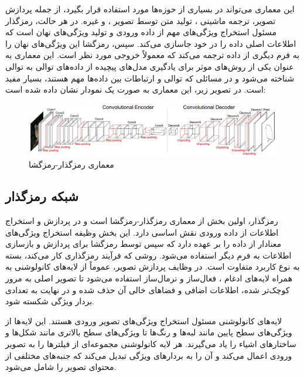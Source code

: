 این معماری می‌تواند در بسیاری از حوزه‌ها مورد استفاده قرار بگیرد، از جمله پردازش تصویر، ترجمه ماشینی
، تولید متن توسط تصویر
، و غیره. در هر حالت، رمزگذار مسئول استخراج ویژگی‌های مهم از داده ورودی و تولید ویژگی‌های نهان است که اطلاعات اصلی داده را در خود جاسازی می‌کند. سپس، رمزگشا این ویژگی‌های نهان را به فرم دیگری از داده ترجمه می‌کند که معمولاً خروجی مورد نظر است. این معماری به عنوان یکی از روش‌های موثر برای یادگیری مدل‌های پیچیده از داده‌های توالی به توالی شناخته می‌شود و در مسائلی که توالی و ارتباطات بین داده‌ها مهم هستند، بسیار مفید است. در تصویر زیر، این معماری به صورت یک نمودار نشان داده شده است:

\begin{figure}[ht]
	\includegraphics[width=\linewidth, height=0.2\textheight]{Images/Chapter2/encoder-decoder.png}
	\centering
	\caption{معماری رمزگذار-رمزگشا}
	\label{fig:fig4}
\end{figure}

\subsection{شبکه رمزگذار}

رمزگذار، اولین بخش از معماری رمزگذار-رمزگشا است و در پردازش و استخراج اطلاعات از داده ورودی نقش اساسی دارد. این بخش وظیفه استخراج ویژگی‌های معنادار از داده را بر عهده دارد که سپس توسط رمزگشا برای پردازش و بازسازی اطلاعات به فرم دیگر استفاده می‌شود. روشی که فرآیند رمزگذاری کار می‌کند، بسته به نوع کاربرد متفاوت است. در وظایف پردازش تصویر، عموماً از لایه‌های کانولوشنی
به همراه لایه‌های ادغام
، فعال‌ساز
و نرمال‌ساز
استفاده می‌شود تا تصویر اصلی به مرور کوچک‌تر شده، اطلاعات اضافی و فضاهای خالی آن حذف شده و در نهایت به تعدادی بردار‌ ویژگی شکسته شود.

لایه‌های کانولوشنی مسئول استخراج ویژگی‌های تصویر ورودی هستند. این لایه‌ها از ویژگی‌های سطح پایین مانند لبه‌ها و رنگ‌ها تا ویژگی‌های سطح بالاتری مانند شکل‌ها و ساختارهای اشیاء را یاد می‌گیرند. هر لایه کانولوشنی مجموعه‌ای از فیلترها را به تصویر ورودی اعمال می‌کند و آن را به بردار‌های ویژگی تبدیل می‌کند که جنبه‌های مختلفی از محتوای تصویر را شامل می‌شود.

